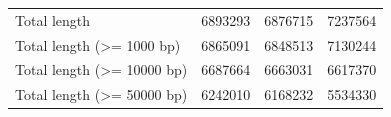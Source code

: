 \documentclass[10pt]{article}
\begin{document}
\begin{table}[]
\begin{tabular}{llll}
Total length & 6893293 & \cellcolor[HTML]{FBDADA}6876715 & \cellcolor[HTML]{CDCDF9}7237564 \\
Total length (\textgreater= 1000 bp) & 6865091 & \cellcolor[HTML]{FBDADA}6848513 & \cellcolor[HTML]{CDCDF9}7130244 \\
Total length (\textgreater= 10000 bp) & \cellcolor[HTML]{CDCDF9}6687664 & 6663031 & \cellcolor[HTML]{FBDADA}6617370 \\
Total length (\textgreater= 50000 bp) & \cellcolor[HTML]{CDCDF9}6242010 & 6168232 & \cellcolor[HTML]{FBDADA}5534330
\end{tabular}
\end{table}


\pagebreak


\end{document}

